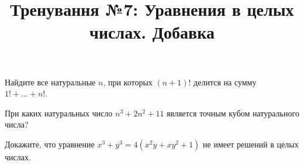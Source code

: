 


\title{Тренування №7: Уравнения в целых числах. Добавка}
\maketitle
\begin{problem}[Факториалы]
	Найдите все натуральные $n$, при которых $(n + 1)!$ делится на сумму $1! + \ldots + n!$.
\end{problem}

\begin{problem}
	При каких натуральных число $n^3 + 2n^2 + 11$ является точным кубом натурального числа?
\end{problem}

\begin{problem}
	Докажите, что уравнение $x^3 + y^3 = 4(x^2 y + x y^2 + 1)$ не имеет решений в целых числах.
\end{problem}


